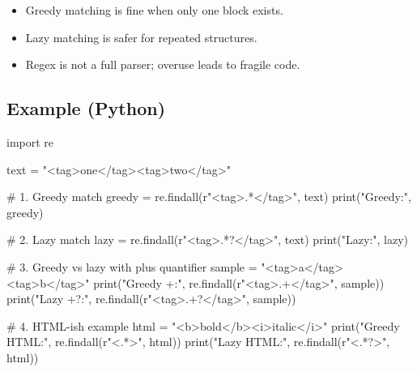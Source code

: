 \documentclass[
  letterpaper,
  DIV=11,
  numbers=noendperiod]{scrreprt}
\newenvironment{Shaded}{\begin{snugshade}}{\end{snugshade}}
\newcommand{\BuiltInTok}[1]{\textcolor[rgb]{0.00,0.23,0.31}{#1}}
\newcommand{\CommentTok}[1]{\textcolor[rgb]{0.37,0.37,0.37}{#1}}
\newcommand{\DecValTok}[1]{\textcolor[rgb]{0.68,0.00,0.00}{#1}}
\newcommand{\ImportTok}[1]{\textcolor[rgb]{0.00,0.46,0.62}{#1}}
\newcommand{\NormalTok}[1]{\textcolor[rgb]{0.00,0.23,0.31}{#1}}
\newcommand{\OperatorTok}[1]{\textcolor[rgb]{0.37,0.37,0.37}{#1}}
\newcommand{\StringTok}[1]{\textcolor[rgb]{0.13,0.47,0.30}{#1}}
\newcommand{\VerbatimStringTok}[1]{\textcolor[rgb]{0.13,0.47,0.30}{#1}}
\providecommand{\tightlist}{%
  \setlength{\itemsep}{0pt}\setlength{\parskip}{0pt}}
\begin{document}
\begin{enumerate}
  \begin{itemize}
  \tightlist
  \item
    Greedy matching is fine when only one block exists.
  \item
    Lazy matching is safer for repeated structures.
  \item
    Regex is not a full parser; overuse leads to fragile code.
  \end{itemize}
\end{enumerate}

\subsection{Example (Python)}\label{example-python-10}

\begin{Shaded}
\begin{Highlighting}[]
\ImportTok{import}\NormalTok{ re}

\NormalTok{text }\OperatorTok{=} \StringTok{"\textless{}tag\textgreater{}one\textless{}/tag\textgreater{}\textless{}tag\textgreater{}two\textless{}/tag\textgreater{}"}

\CommentTok{\# 1. Greedy match}
\NormalTok{greedy }\OperatorTok{=}\NormalTok{ re.findall(}\VerbatimStringTok{r"\textless{}tag\textgreater{}}\DecValTok{.}\OperatorTok{*}\VerbatimStringTok{\textless{}/tag\textgreater{}"}\NormalTok{, text)}
\BuiltInTok{print}\NormalTok{(}\StringTok{"Greedy:"}\NormalTok{, greedy)}

\CommentTok{\# 2. Lazy match}
\NormalTok{lazy }\OperatorTok{=}\NormalTok{ re.findall(}\VerbatimStringTok{r"\textless{}tag\textgreater{}}\DecValTok{.}\OperatorTok{*?}\VerbatimStringTok{\textless{}/tag\textgreater{}"}\NormalTok{, text)}
\BuiltInTok{print}\NormalTok{(}\StringTok{"Lazy:"}\NormalTok{, lazy)}

\CommentTok{\# 3. Greedy vs lazy with plus quantifier}
\NormalTok{sample }\OperatorTok{=} \StringTok{"\textless{}tag\textgreater{}a\textless{}/tag\textgreater{}\textless{}tag\textgreater{}b\textless{}/tag\textgreater{}"}
\BuiltInTok{print}\NormalTok{(}\StringTok{"Greedy +:"}\NormalTok{, re.findall(}\VerbatimStringTok{r"\textless{}tag\textgreater{}}\DecValTok{.}\OperatorTok{+}\VerbatimStringTok{\textless{}/tag\textgreater{}"}\NormalTok{, sample))}
\BuiltInTok{print}\NormalTok{(}\StringTok{"Lazy +?:"}\NormalTok{, re.findall(}\VerbatimStringTok{r"\textless{}tag\textgreater{}}\DecValTok{.}\OperatorTok{+?}\VerbatimStringTok{\textless{}/tag\textgreater{}"}\NormalTok{, sample))}

\CommentTok{\# 4. HTML{-}ish example}
\NormalTok{html }\OperatorTok{=} \StringTok{"\textless{}b\textgreater{}bold\textless{}/b\textgreater{}\textless{}i\textgreater{}italic\textless{}/i\textgreater{}"}
\BuiltInTok{print}\NormalTok{(}\StringTok{"Greedy HTML:"}\NormalTok{, re.findall(}\VerbatimStringTok{r"\textless{}}\DecValTok{.}\OperatorTok{*}\VerbatimStringTok{\textgreater{}"}\NormalTok{, html))}
\BuiltInTok{print}\NormalTok{(}\StringTok{"Lazy HTML:"}\NormalTok{, re.findall(}\VerbatimStringTok{r"\textless{}}\DecValTok{.}\OperatorTok{*?}\VerbatimStringTok{\textgreater{}"}\NormalTok{, html))}
\end{Highlighting}
\end{Shaded}
\end{document}
